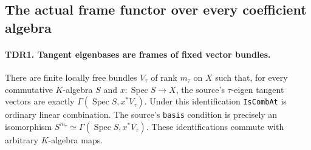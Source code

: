 \documentclass[11pt,a4paper]{article}
\numberwithin{equation}{section}
\theoremstyle{remark}\newtheorem{remark}[theorem]{Remark}
\begin{document}
\subsection{The actual frame functor over every coefficient algebra}

\paragraph{TDR1. Tangent eigenbases are frames of fixed vector bundles.}
\label{claim:TDR1}
There are finite locally free bundles \(V_\tau\) of rank \(m_\tau\)
on \(X\) such that, for every commutative \(K\)-algebra \(S\) and
\(x:\operatorname{Spec}S\to X\), the source's
\(\tau\)-eigen tangent vectors are exactly
\(\Gamma(\operatorname{Spec}S,x^*V_\tau)\).
Under this identification \texttt{Is\allowbreak Comb\allowbreak At} is ordinary linear
combination.  The source's \texttt{basis} condition is precisely an
isomorphism \(S^{m_\tau}\simeq\Gamma(\operatorname{Spec}S,x^*V_\tau)\).
These identifications commute with arbitrary \(K\)-algebra maps.
\end{document}
